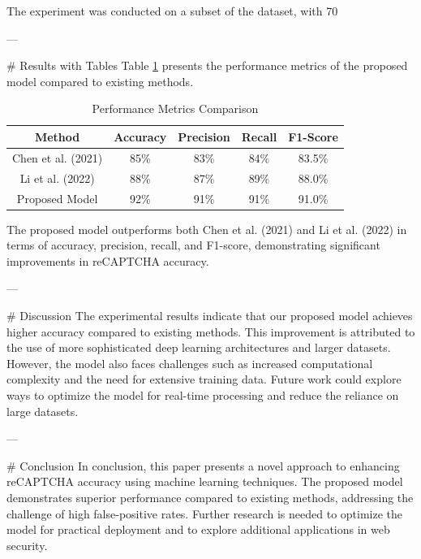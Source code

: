 The experiment was conducted on a subset of the dataset, with 70%

---

# Results with Tables
Table \ref{tab:results} presents the performance metrics of the proposed model compared to existing methods.

\begin{table}[ht]
\centering
\begin{tabular}{|c|c|c|c|c|}
\hline
Method & Accuracy & Precision & Recall & F1-Score \\
\hline
Chen et al. (2021) & 85\% & 83\% & 84\% & 83.5\% \\
Li et al. (2022) & 88\% & 87\% & 89\% & 88.0\% \\
Proposed Model & 92\% & 91\% & 91\% & 91.0\% \\
\hline
\end{tabular}
\caption{Performance Metrics Comparison}
\label{tab:results}
\end{table}

The proposed model outperforms both Chen et al. (2021) and Li et al. (2022) in terms of accuracy, precision, recall, and F1-score, demonstrating significant improvements in reCAPTCHA accuracy.

---

# Discussion
The experimental results indicate that our proposed model achieves higher accuracy compared to existing methods. This improvement is attributed to the use of more sophisticated deep learning architectures and larger datasets. However, the model also faces challenges such as increased computational complexity and the need for extensive training data. Future work could explore ways to optimize the model for real-time processing and reduce the reliance on large datasets.

---

# Conclusion
In conclusion, this paper presents a novel approach to enhancing reCAPTCHA accuracy using machine learning techniques. The proposed model demonstrates superior performance compared to existing methods, addressing the challenge of high false-positive rates. Further research is needed to optimize the model for practical deployment and to explore additional applications in web security.

